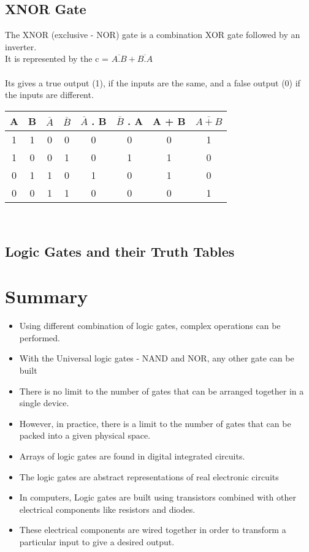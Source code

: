 \documentclass{article}
\begin{document}
\subsection{XNOR Gate}
The XNOR (exclusive - NOR) gate is a combination XOR gate followed by an inverter. \\
 It is represented by the \color{red} c = $\overline{A.B} + \overline{B.A}$  \\ \color{black} \\
Its gives a  true output (1), if the inputs are the same, and a false output (0) if the inputs are different. \\
\begin{table}[h!]
	\begin{center}
		\begin{tabular}{c|c|c|c|c|c|c|c}
			\textbf{A} & \textbf{B} & \textbf{$\overline{A}$} & \textbf{$\overline{B}$} & \textbf{$\overline{A}$ . B} & \textbf{$\overline{B}$ . A} & \textbf{A} + \textbf{B} & \textbf{$\overline{A + B}$}\\
			\hline
			1 & 1 & 0 & 0 & 0 & 0 & 0 & 1\\
			\hline
			1 & 0 & 0 & 1 & 0 & 1 & 1 & 0\\
			\hline
			0 & 1 & 1 & 0 & 1 & 0 & 1 & 0\\
			\hline
			0 & 0 & 1 & 1 & 0 & 0 & 0 & 1\\
			\hline
		\end{tabular}
	\end{center}
\end{table} \\

\subsection{Logic Gates and their Truth Tables}

\section{Summary}
\begin{itemize}
	\item Using different combination of logic gates, complex operations can be performed. 
	\item With the Universal logic gates - NAND and NOR, any other gate can be built
	\item There is no limit to the number of gates that can be arranged together in a single device. 
	\item However, in practice, there is a limit to the number of gates that can be packed into a given physical space. 
	\item Arrays of logic gates are found in digital integrated circuits.
	\item The logic gates are abstract representations of real electronic circuits
	\item In computers, Logic gates are built using transistors combined with other electrical components like resistors and diodes. 
	\item These electrical components are wired together in order to transform a particular input to give a desired output. \cite{108}
\end{itemize}
\end{document}
